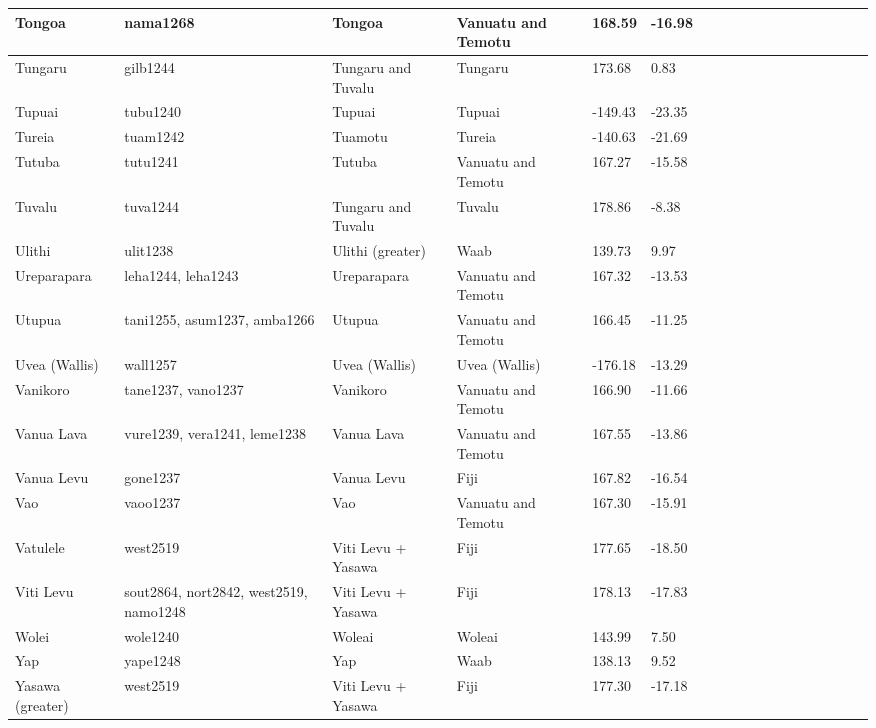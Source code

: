 \documentclass[draft,10pt]{article} %
\begin{document}
\begin{landscape}
\begin{longtable}{| p{2.5cm} |  p{7cm} | p{2.5cm}  | p{2.5cm}  | p{2.5cm}  | p{2.5cm}  | p{2.5cm}  | p{2cm}  | p{1cm} | p{1cm}  | p{1cm} | p{1cm}  | p{1.5cm}  | p{1cm} | p{1cm}  | p{1cm}  |p{1cm}  | p{1cm}    |}
 Tongoa & nama1268 & Tongoa & Vanuatu and Temotu & 168.59 & -16.98 \\ \hline
 Tungaru & gilb1244 & Tungaru and Tuvalu & Tungaru & 173.68 & 0.83 \\ \hline
 Tupuai & tubu1240 & Tupuai & Tupuai & -149.43 & -23.35 \\ \hline
 Tureia & tuam1242 & Tuamotu & Tureia & -140.63 & -21.69 \\ \hline
 Tutuba & tutu1241 & Tutuba & Vanuatu and Temotu & 167.27 & -15.58 \\ \hline
 Tuvalu & tuva1244 & Tungaru and Tuvalu & Tuvalu & 178.86 & -8.38 \\ \hline
 Ulithi & ulit1238 & Ulithi (greater) & Waab & 139.73 & 9.97 \\ \hline
 Ureparapara & leha1244, leha1243 & Ureparapara & Vanuatu and Temotu & 167.32 & -13.53 \\ \hline
 Utupua & tani1255, asum1237, amba1266 & Utupua & Vanuatu and Temotu & 166.45 & -11.25 \\ \hline
 Uvea (Wallis) & wall1257 & Uvea (Wallis) & Uvea (Wallis) & -176.18 & -13.29 \\ \hline
 Vanikoro & tane1237, vano1237 & Vanikoro & Vanuatu and Temotu & 166.90 & -11.66 \\ \hline
 Vanua Lava & vure1239, vera1241, leme1238 & Vanua Lava & Vanuatu and Temotu & 167.55 & -13.86 \\ \hline
 Vanua Levu & gone1237 & Vanua Levu & Fiji & 167.82 & -16.54 \\ \hline
 Vao & vaoo1237 & Vao & Vanuatu and Temotu & 167.30 & -15.91 \\ \hline
 Vatulele & west2519 & Viti Levu + Yasawa & Fiji & 177.65 & -18.50 \\ \hline
 Viti Levu & sout2864,  nort2842,  west2519,  namo1248 & Viti Levu + Yasawa & Fiji & 178.13 & -17.83 \\ \hline
 Wolei & wole1240 & Woleai & Woleai & 143.99 & 7.50 \\ \hline
 Yap & yape1248 & Yap & Waab & 138.13 & 9.52 \\ \hline
 Yasawa (greater) & west2519 & Viti Levu + Yasawa & Fiji & 177.30 & -17.18 \\ \hline


 \end{longtable}
\end{landscape}
\newpage
\end{document}
